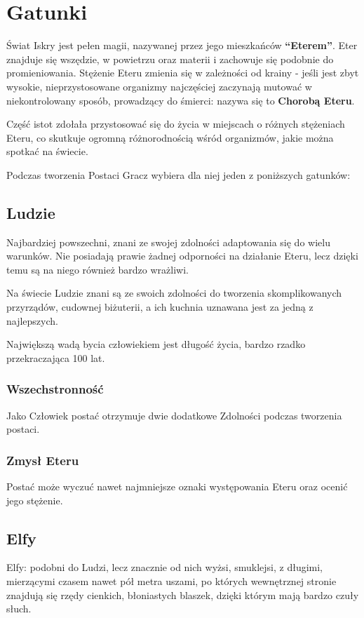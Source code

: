 \documentclass[10pt,a4paper]{book}
\begin{document}
\section{Gatunki}
\begin{multicols}{2}

Świat Iskry jest pełen magii, nazywanej przez jego mieszkańców \textbf{“Eterem”}. Eter znajduje się wszędzie, w powietrzu oraz materii i zachowuje się podobnie do promieniowania. Stężenie Eteru zmienia się w zależności od krainy - jeśli jest zbyt wysokie, nieprzystosowane organizmy najczęściej zaczynają mutować w niekontrolowany sposób, prowadzący do śmierci: nazywa się to \textbf{Chorobą Eteru}.

Część istot zdołała przystosować się do życia w miejscach o różnych stężeniach Eteru, co skutkuje ogromną różnorodnością wśród organizmów, jakie można spotkać na świecie.

Podczas tworzenia Postaci Gracz wybiera dla niej jeden z poniższych gatunków:


\subsection*{Ludzie}
Najbardziej powszechni, znani ze swojej zdolności adaptowania się do wielu warunków. Nie posiadają prawie żadnej odporności na działanie Eteru, lecz dzięki temu są na niego również bardzo wrażliwi.

Na świecie Ludzie znani są ze swoich zdolności do tworzenia skomplikowanych przyrządów, cudownej biżuterii, a ich kuchnia uznawana jest za jedną z najlepszych.

Największą wadą bycia człowiekiem jest długość życia, bardzo rzadko przekraczająca 100 lat.

\subsubsection*{Wszechstronność}
Jako Człowiek postać otrzymuje dwie dodatkowe Zdolności podczas tworzenia postaci.

\subsubsection*{Zmysł Eteru}Postać może wyczuć nawet najmniejsze oznaki występowania Eteru oraz ocenić jego stężenie. 




\subsection*{Elfy}
Elfy: podobni do Ludzi, lecz znacznie od nich wyżsi, smuklejsi, z długimi, mierzącymi czasem nawet pół metra uszami, po których wewnętrznej stronie znajdują się rzędy cienkich, błoniastych blaszek, dzięki którym mają bardzo czuły słuch.


\end{multicols}
\end{document}
